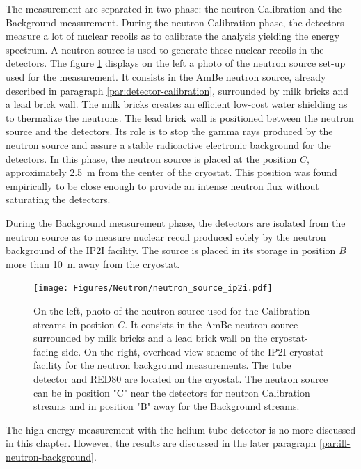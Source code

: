The measurement are separated in two phase: the neutron Calibration and the Background measurement.
During the neutron Calibration phase, the detectors measure a lot of nuclear recoils as to calibrate the analysis yielding the energy spectrum. A neutron source is used to generate these nuclear recoils in the detectors. The figure \ref{fig:scheme-ip2i} displays on the left a photo of the neutron source set-up used for the measurement. It consists in the AmBe neutron source, already described in paragraph \ref{par:detector-calibration}, surrounded by milk bricks and a lead brick wall. The milk bricks creates an efficient low-cost water shielding as to thermalize the neutrons. The lead brick wall is positioned between the neutron source and the detectors. Its role is to stop the gamma rays produced by the neutron source and assure a stable radioactive electronic background for the detectors.
In this phase, the neutron source is placed at the position $C$, approximately \SI{2.5}{\meter} from the center of the cryostat. This position was found empirically to be close enough to provide an intense neutron flux without saturating the detectors.

During the Background measurement phase, the detectors are isolated from the neutron source as to measure nuclear recoil produced solely by the neutron background of the IP2I facility. The source is placed in its storage in position $B$ more than \SI{10}{\m} away from the cryostat.

\begin{figure}
\centering
\texttt{[image: Figures/Neutron/neutron\_source\_ip2i.pdf]}
\caption{On the left, photo of the neutron source used for the Calibration streams in position $C$. It consists in the AmBe neutron source surrounded by milk bricks and a lead brick wall on the cryostat-facing side. On the right, overhead view scheme of the IP2I cryostat facility for the neutron background measurements. The  tube detector and RED80 are located on the cryostat. The neutron source can be in position "C"  near the detectors for neutron Calibration streams and in position "B" away for the Background streams.}
\label{fig:scheme-ip2i}
\end{figure}

The high energy measurement with the helium tube detector is no more discussed in this chapter. However, the results are discussed in the later paragraph \ref{par:ill-neutron-background}.

